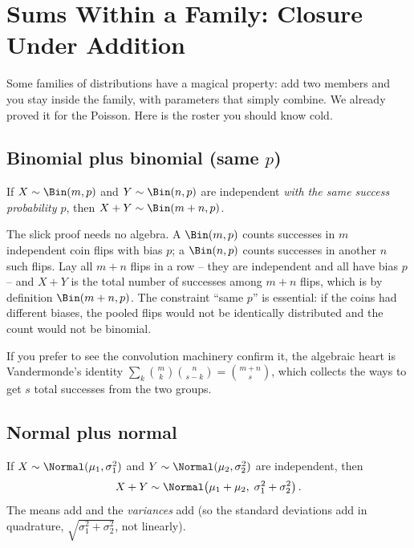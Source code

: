 \section{Sums Within a Family: Closure Under Addition}
\label{ch17:closure}

Some families of distributions have a magical property: add two members
and you stay inside the family, with parameters that simply combine. We
already proved it for the Poisson. Here is the roster you should know cold.

\subsection{Binomial plus binomial (same \texorpdfstring{$p$}{p})}

\begin{theorem}
\label{ch17:thm-bin-add}
If $X\sim\Bin(m,p)$ and $Y\sim\Bin(n,p)$ are independent \emph{with the
same success probability $p$}, then $X+Y\sim\Bin(m+n,p)$.
\end{theorem}

\begin{whybox}
The slick proof needs no algebra. A $\Bin(m,p)$ counts successes in $m$
independent coin flips with bias $p$; a $\Bin(n,p)$ counts successes in
another $n$ such flips. Lay all $m+n$ flips in a row -- they are
independent and all have bias $p$ -- and $X+Y$ is the total number of
successes among $m+n$ flips, which is by definition $\Bin(m+n,p)$. The
constraint ``same $p$'' is essential: if the coins had different biases,
the pooled flips would not be identically distributed and the count would
not be binomial.
\end{whybox}

If you prefer to see the convolution machinery confirm it, the algebraic
heart is Vandermonde's identity
$\sum_{k}\binom{m}{k}\binom{n}{s-k}=\binom{m+n}{s}$, which collects the
ways to get $s$ total successes from the two groups.

\subsection{Normal plus normal}

\begin{theorem}
\label{ch17:thm-normal-add}
If $X\sim\Normal(\mu_1,\sigma_1^2)$ and $Y\sim\Normal(\mu_2,\sigma_2^2)$
are independent, then
\[
X+Y \sim \Normal\!\left(\mu_1+\mu_2,\;\sigma_1^2+\sigma_2^2\right).
\]
The means add and the \emph{variances} add (so the standard deviations add
in quadrature, $\sqrt{\sigma_1^2+\sigma_2^2}$, not linearly).
\end{theorem}

